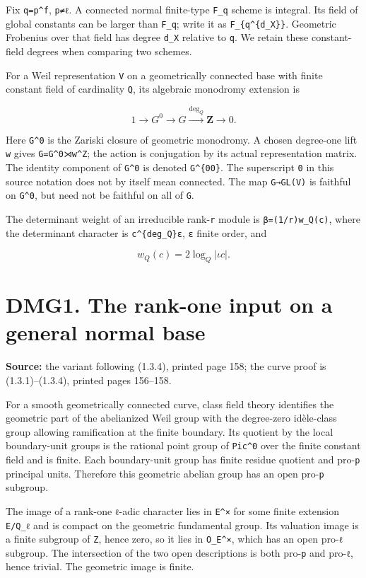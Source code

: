\documentclass[
]{report}
\begin{document}
Fix \texttt{q=p\^{}f}, \texttt{p≠ℓ}. A connected normal finite-type
\texttt{F\_q} scheme is integral. Its field of global constants can be
larger than \texttt{F\_q}; write it as \texttt{F\_\{q\^{}\{d\_X\}\}}.
Geometric Frobenius over that field has degree \texttt{d\_X} relative to
\texttt{q}. We retain these constant-field degrees when comparing two
schemes.

For a Weil representation \texttt{V} on a geometrically connected base
with finite constant field of cardinality \texttt{Q}, its algebraic
monodromy extension is

\[
1\longrightarrow G^0\longrightarrow G\xrightarrow{\deg_Q}\mathbf Z\longrightarrow0.
\tag{DMG0.1}
\]

Here \texttt{G\^{}0} is the Zariski closure of geometric monodromy. A
chosen degree-one lift \texttt{w} gives \texttt{G=G\^{}0⋊w\^{}Z}; the
action is conjugation by its actual representation matrix. The identity
component of \texttt{G\^{}0} is denoted \texttt{G\^{}\{00\}}. The
superscript \texttt{0} in this source notation does not by itself mean
connected. The map \texttt{G→GL(V)} is faithful on \texttt{G\^{}0}, but
need not be faithful on all of \texttt{G}.

The determinant weight of an irreducible rank-\texttt{r} module is
\texttt{β=(1/r)w\_Q(c)}, where the determinant character is
\texttt{c\^{}\{deg\_Q\}ε}, \texttt{ε} finite order, and

\[
w_Q(c)=2\log_Q|\iota c|.
\]

\section{DMG1. The rank-one input on a general normal
base}\label{dmg1.-the-rank-one-input-on-a-general-normal-base}

\textbf{Source:} the variant following (1.3.4), printed page 158; the
curve proof is (1.3.1)--(1.3.4), printed pages 156--158.

For a smooth geometrically connected curve, class field theory
identifies the geometric part of the abelianized Weil group with the
degree-zero idèle-class group allowing ramification at the finite
boundary. Its quotient by the local boundary-unit groups is the rational
point group of \texttt{Pic\^{}0} over the finite constant field and is
finite. Each boundary-unit group has finite residue quotient and
pro-\texttt{p} principal units. Therefore this geometric abelian group
has an open pro-\texttt{p} subgroup.

The image of a rank-one \texttt{ℓ}-adic character lies in
\texttt{E\^{}×} for some finite extension \texttt{E/Q\_ℓ} and is compact
on the geometric fundamental group. Its valuation image is a finite
subgroup of \texttt{Z}, hence zero, so it lies in \texttt{O\_E\^{}×},
which has an open pro-\texttt{ℓ} subgroup. The intersection of the two
open descriptions is both pro-\texttt{p} and pro-\texttt{ℓ}, hence
trivial. The geometric image is finite.
\end{document}
